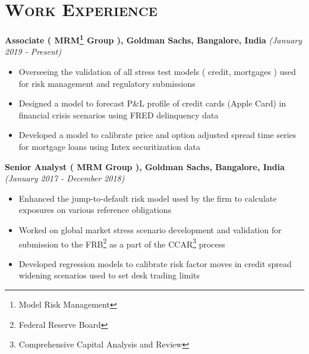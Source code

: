 \documentclass [letterpaper,10pt]{article}
\newcommand{\NewPart}[1]{\section*{\large\textsc{#1}}}
\begin{document}
\vspace{-10pt}
\NewPart{Work Experience}{}
\vspace{-3pt}
\textbf{Associate ( MRM\footnote{Model Risk Management} Group ), Goldman Sachs, Bangalore, India} \hfill\emph{(January 2019 - Present)}\\
\vspace{-16pt}
\begin{itemize} \itemsep -2.5pt
	\item Overseeing the validation of all stress test models ( credit, mortgages ) used for risk management and regulatory submissions
	\item Designed a model to forecast P\&L profile of credit cards (Apple Card) in financial crisis scenarios using FRED delinquency data
	\item Developed a model to calibrate price and option adjusted spread time series for mortgage loans using Intex securitization data
	
\end{itemize}
\vspace{-3pt}
\textbf{Senior Analyst ( MRM Group ), Goldman Sachs, Bangalore, India} \hfill\emph{(January 2017 - December 2018)}\\
\vspace{-16pt}
\begin{itemize} \itemsep -2.5pt
	\item Enhanced the jump-to-default risk model used by the firm to calculate exposures on various reference obligations
	\item Worked on global market stress scenario development and validation for submission to the FRB\footnote{Federal Reserve Board} as a part of the CCAR\footnote{Comprehensive Capital Analysis and Review} process
	\item Developed regression models to calibrate risk factor moves in credit spread widening scenarios used to set desk trading limits
\end{itemize}
\end{document}
